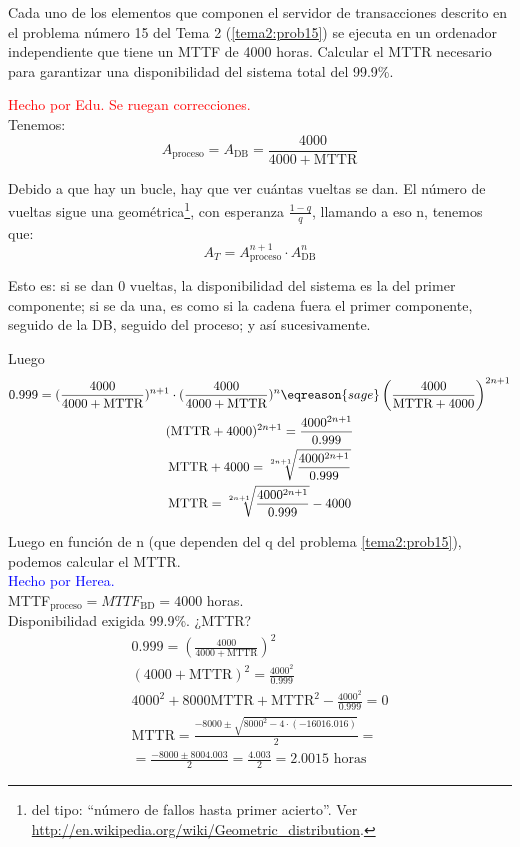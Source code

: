 \begin{problem}[8]
Cada uno de los elementos que componen el servidor de transacciones descrito en el problema número 15 del Tema 2 (\ref{tema2:prob15}) se ejecuta en un ordenador independiente que tiene un MTTF de 4000 horas. Calcular el MTTR necesario para garantizar una disponibilidad del sistema total del 99.9\%.

\solution
\textcolor{red}{Hecho por Edu. Se ruegan correcciones.}\\

Tenemos:
\[ A_{\text{proceso}} = A_{\text{DB}} = \frac{4000}{4000+\text{MTTR}}\]

Debido a que hay un bucle, hay que ver cuántas vueltas se dan. El número de vueltas sigue una geométrica\footnote{del tipo: ``número de fallos hasta primer acierto''. Ver \url{http://en.wikipedia.org/wiki/Geometric_distribution}.}, con esperanza $\frac{1-q}{q}$, llamando a eso n, tenemos que:
\[ A_T = A_{\text{proceso}}^{n+1} \cdot A_{\text{DB}}^{n} \]

Esto es: si se dan 0 vueltas, la disponibilidad del sistema es la del primer componente; si se da una, es como si la cadena fuera el primer componente, seguido de la DB, seguido del proceso; y así sucesivamente.

Luego
\begin{gather*}
0.999 = (\frac{4000}{4000+\text{MTTR}})^{n+1} \cdot (\frac{4000}{4000+\text{MTTR}})^{n} \eqreason{sage} \left(\frac{4000}{\text{MTTR} + 4000}\right)^{2n + 1}\\
(\text{MTTR} + 4000)^{2n + 1} = \frac{4000^{2n + 1}}{0.999} \\
\text{MTTR} + 4000 = \sqrt[2n+1]{\frac{4000^{2n + 1}}{0.999}}\\
\text{MTTR} = \sqrt[2n+1]{\frac{4000^{2n + 1}}{0.999}} - 4000\\
\end{gather*}

Luego en función de n (que dependen del q del problema \ref{tema2:prob15}), podemos calcular el MTTR.\\

\newpage
\textcolor{blue}{Hecho por Herea.}\\
MTTF$_{\text{proceso}} = MTTF_{\text{BD}} = 4000$ horas.\\
Disponibilidad exigida 99.9\%. ¿MTTR?
\begin{gather*}
0.999 = \left(\frac{4000}{4000+\text{MTTR}}\right)^2 \\
(4000+\text{MTTR})^2 = \frac{4000^2}{0.999} \\
4000^2 + 8000 \text{MTTR} + \text{MTTR}^2 - \frac{4000^2}{0.999} = 0\\
\text{MTTR} = \frac{-8000 \pm \sqrt{8000^2 - 4 \cdot (-16016.016)}}{2} = \\
= \frac{-8000 \pm 8004.003}{2} = \frac{4.003}{2} = 2.0015 \text{ horas}
\end{gather*}
\end{problem}

